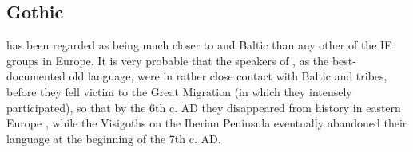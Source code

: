 \documentclass[output=paper]{langsci/langscibook}
\begin{document}
\subsection{Gothic}\label{sec:wiemerserzant:5.3}

 has been regarded as being much closer to  and Baltic than any other of the IE groups in Europe. It is very probable that the speakers of , as the best-documented old  language, were in rather close contact with Baltic and  tribes, before they fell victim to the Great Migration (in which they intensely participated), so that by the 6th c. AD they disappeared from history in eastern Europe \citep[13–15]{Kotin2012}, while the Visigoths on the Iberian Peninsula eventually abandoned their language at the beginning of the 7th c. AD.
\end{document}

